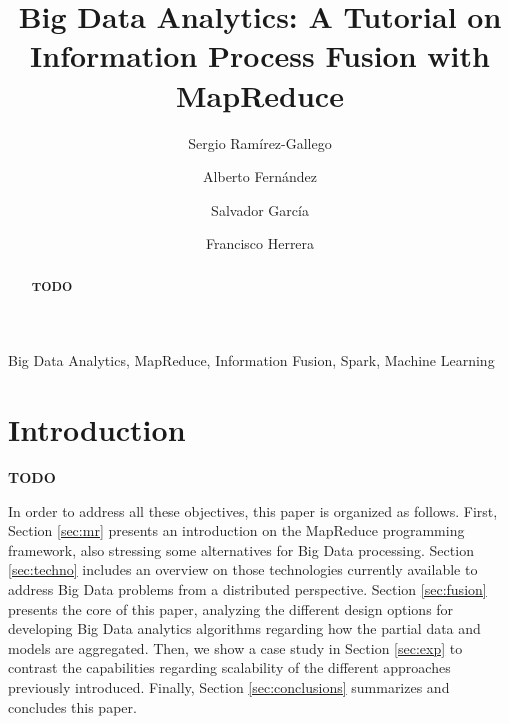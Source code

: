 \documentclass[3p,review]{elsarticle}
\newcommand{\TODO}{\textbf{TODO}}
\begin{document}
\begin{frontmatter}

\title{Big Data Analytics: A Tutorial on Information Process Fusion with MapReduce}

\author[grx]{Sergio Ram\'irez-Gallego}

\author[grx]{Alberto Fern\'andez}

\author[grx]{Salvador Garc\'ia}

\author[grx]{Francisco Herrera}

\address[grx]{Department of Computer Science and Artificial Intelligence, University of Granada, Granada, Spain}



\begin{abstract}

\TODO


\end{abstract}

\begin{keyword}
Big Data Analytics, MapReduce, Information Fusion, Spark, Machine Learning
\end{keyword}

\end{frontmatter}

\section{Introduction}\label{sec:intro}

\TODO

In order to address all these objectives, this paper is organized as follows. First, Section \ref{sec:mr} presents an introduction on the MapReduce programming framework, also stressing some alternatives for Big Data processing. Section \ref{sec:techno} includes an overview on those technologies currently available to address Big Data problems from a distributed perspective. Section \ref{sec:fusion} presents the core of this paper, analyzing the different design options for developing Big Data analytics algorithms regarding how the partial data and models are aggregated. Then, we show a case study in Section \ref{sec:exp} to contrast the capabilities regarding scalability of the different approaches previously introduced. Finally, Section \ref{sec:conclusions} summarizes and concludes this paper.
\end{document}
